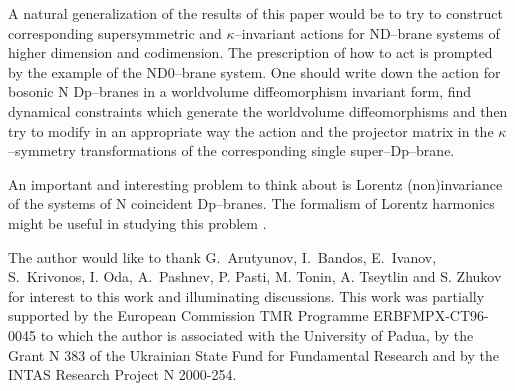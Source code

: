 \documentclass[a4paper,12pt]{article}
\begin{document}
A natural generalization of the results of this paper would be
to try to construct corresponding supersymmetric and $\kappa$--invariant
actions for ND--brane systems of higher dimension and codimension.
The prescription of how to act is prompted by the example of the
ND0--brane system. One should write down the action for bosonic N
Dp--branes in a worldvolume diffeomorphism invariant form, find
dynamical constraints which generate the worldvolume
diffeomorphisms and then try to modify in an appropriate way the
action and the projector matrix in the $\kappa$--symmetry transformations
of the corresponding single super--Dp--brane.

An  important and interesting problem to think about is Lorentz
(non)invariance of the systems of N coincident Dp--branes.
The formalism of Lorentz harmonics might be useful in studying this problem
\cite{harm}.

\bigskip
{} The author would like to thank
G.~Arutyunov,  I.~Bandos, E.~Ivanov, S.~Krivonos, I. Oda,
A.~Pashnev, P. Pasti, M. Tonin, A. Tseytlin and S. Zhukov for
interest to this work and illuminating discussions. This work was
partially supported by the European Commission TMR Programme
ERBFMPX-CT96-0045 to which the author is associated with the
University of Padua, by the Grant N 383 of the Ukrainian State
Fund for Fundamental Research and by the INTAS Research Project N
2000-254.
\end{document}
